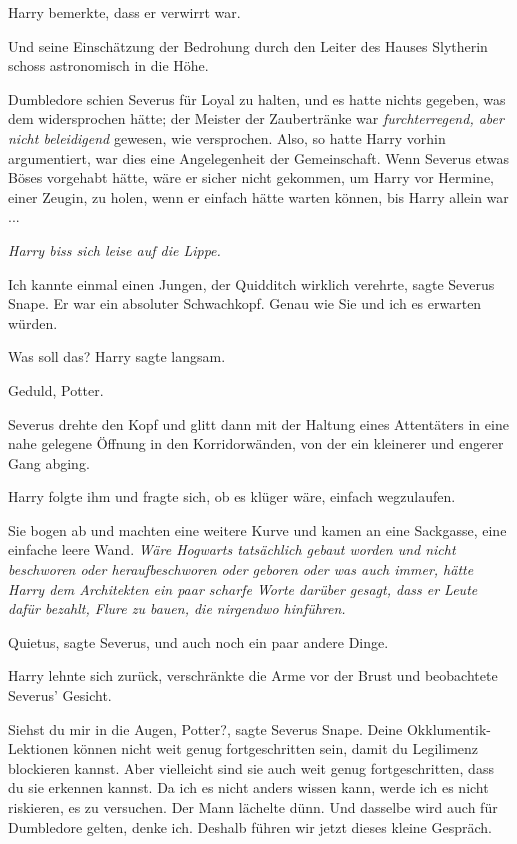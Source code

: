 Harry bemerkte, dass er verwirrt war.

Und seine Einschätzung der Bedrohung durch den Leiter des Hauses Slytherin
schoss astronomisch in die Höhe.

Dumbledore schien Severus für Loyal zu halten, und es hatte nichts gegeben, was
dem widersprochen hätte; der Meister der Zaubertränke war \glqq{}
\emph{furchterregend, aber nicht beleidigend}\grqq{} gewesen, wie versprochen.
Also, so hatte Harry vorhin argumentiert, war dies eine Angelegenheit der
Gemeinschaft. Wenn Severus etwas Böses vorgehabt hätte, wäre er sicher nicht
gekommen, um Harry vor Hermine, einer Zeugin, zu holen, wenn er einfach hätte
warten können, bis Harry allein war ...

\emph{Harry biss sich leise auf die Lippe.}

\glqq{}Ich kannte einmal einen Jungen, der Quidditch wirklich verehrte\grqq{},
sagte Severus Snape. \glqq{}Er war ein absoluter Schwachkopf. Genau wie Sie und
ich es erwarten würden.\grqq{}

\glqq{}Was soll das?\grqq{} Harry sagte langsam.

\glqq{}Geduld, Potter.\grqq{}

Severus drehte den Kopf und glitt dann mit der Haltung eines Attentäters in eine
nahe gelegene Öffnung in den Korridorwänden, von der ein kleinerer und engerer
Gang abging.

Harry folgte ihm und fragte sich, ob es klüger wäre, einfach wegzulaufen.

Sie bogen ab und machten eine weitere Kurve und kamen an eine Sackgasse, eine
einfache leere Wand. \emph{Wäre Hogwarts tatsächlich gebaut worden und nicht
beschworen oder heraufbeschworen oder geboren oder was auch immer, hätte Harry
dem Architekten ein paar scharfe Worte darüber gesagt, dass er Leute dafür
bezahlt, Flure zu bauen, die nirgendwo hinführen.}

\glqq{}Quietus\grqq{}, sagte Severus, und auch noch ein paar andere Dinge.

Harry lehnte sich zurück, verschränkte die Arme vor der Brust und beobachtete
Severus' Gesicht.

\glqq{}Siehst du mir in die Augen, Potter?\grqq{}, sagte Severus Snape. \glqq{}
Deine Okklumentik-Lektionen können nicht weit genug fortgeschritten sein, damit
du Legilimenz blockieren kannst. Aber vielleicht sind sie auch weit genug
fortgeschritten, dass du sie erkennen kannst. Da ich es nicht anders wissen
kann, werde ich es nicht riskieren, es zu versuchen.\grqq{} Der Mann lächelte
dünn. \glqq{}Und dasselbe wird auch für Dumbledore gelten, denke ich. Deshalb
führen wir jetzt dieses kleine Gespräch.\grqq{}

